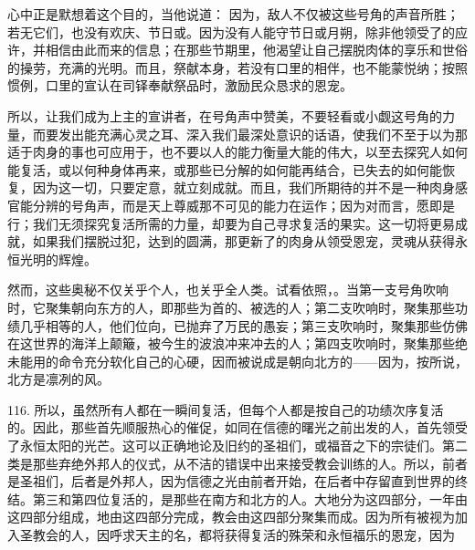 心中正是默想着这个目的，当他说道： 因为，敌人不仅被这些号角的声音所胜；若无它们，也没有欢庆、节日或。因为没有人能守节日或月朔，除非他领受了的应许，并相信由此而来的信息；在那些节期里，他渴望让自己摆脱肉体的享乐和世俗的操劳，充满的光明。而且，祭献本身，若没有口里的相伴，也不能蒙悦纳；按照惯例，口里的宣认在司铎奉献祭品时，激励民众恳求的恩宠。\par

所以，让我们成为上主的宣讲者，在号角声中赞美，不要轻看或小觑这号角的力量，而要发出能充满心灵之耳、深入我们最深处意识的话语，使我们不至于以为那适于肉身的事也可应用于，也不要以人的能力衡量大能的伟大，以至去探究人如何能复活，或以何种身体再来，或那些已分解的如何能再结合，已失去的如何能恢复，因为这一切，只要定意，就立刻成就。而且，我们所期待的并不是一种肉身感官能分辨的号角声，而是天上尊威那不可见的能力在运作；因为对而言，愿即是行；我们无须探究复活所需的力量，却要为自己寻求复活的果实。这一切将更易成就，如果我们摆脱过犯，达到的圆满，那更新了的肉身从领受恩宠，灵魂从获得永恒光明的辉煌。\par

然而，这些奥秘不仅关乎个人，也关乎全人类。试看依照，。当第一支号角吹响时，它聚集朝向东方的人，即那些为首的、被选的人；第二支吹响时，聚集那些功绩几乎相等的人，他们位向，已抛弃了万民的愚妄；第三支吹响时，聚集那些仿佛在这世界的海洋上颠簸，被今生的波浪冲来冲去的人；第四支吹响时，聚集那些绝未能用的命令充分软化自己的心硬，因而被说成是朝向北方的——因为，按所说，北方是凛冽的风。\par

116. 所以，虽然所有人都在一瞬间复活，但每个人都是按自己的功绩次序复活的。因此，那些首先顺服热心的催促，如同在信德的曙光之前出发的人，首先领受了永恒太阳的光芒。这可以正确地论及旧约的圣祖们，或福音之下的宗徒们。第二类是那些弃绝外邦人的仪式，从不洁的错误中出来接受教会训练的人。所以，前者是圣祖们，后者是外邦人，因为信德之光由前者开始，在后者中存留直到世界的终结。第三和第四位复活的，是那些在南方和北方的人。大地分为这四部分，一年由这四部分组成，地由这四部分完成，教会由这四部分聚集而成。因为所有被视为加入圣教会的人，因呼求天主的名，都将获得复活的殊荣和永恒福乐的恩宠，因为\par

